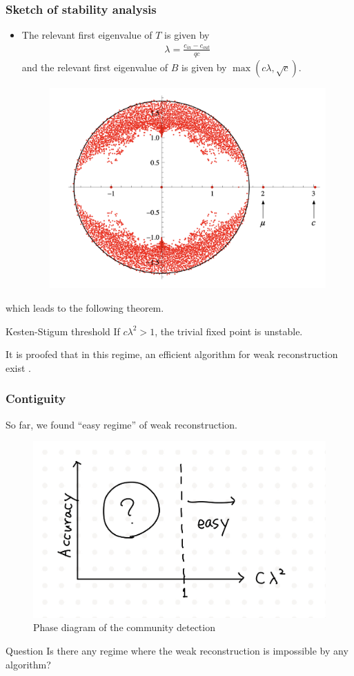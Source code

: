 \documentclass[dvipdfmx,11pt]{beamer}
\begin{document}
\begin{frame}
  \frametitle{Sketch of stability analysis}
  \begin{itemize}
    \item The relevant first eigenvalue of $T$ is given by 
    \begin{align*}
      \lambda = \frac{c_{in} - c_{out}}{qc}
    \end{align*}
    and the relevant first eigenvalue of $B$ is given by $\max(c\lambda, \sqrt{c})$.
    \begin{figure}
      \centering
      \includegraphics[width=0.3\linewidth]{figure/eign.png}
    \end{figure}
  \end{itemize}
  which leads to the following theorem.


\begin{block}{Kesten-Stigum threshold}
  If $c\lambda^2 > 1$, the trivial fixed point is unstable.
\end{block}
It is proofed that in this regime, an efficient algorithm for weak reconstruction exist \Smiley.
  

\end{frame}

\begin{frame}
  \frametitle{Contiguity}
  So far, we found ``easy regime'' of weak reconstruction.
  \begin{figure}
    \centering
    \includegraphics[width=0.5\linewidth]{figure/phase1.jpeg}
    \caption{Phase diagram of the community detection}
  \end{figure}
  \begin{block}{Question}
    Is there any regime where the weak reconstruction is impossible by any algorithm?
  \end{block}
\end{frame}
\end{document}
